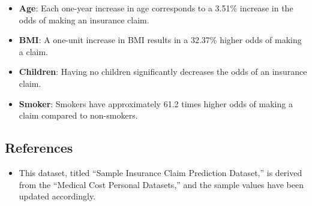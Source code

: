 \documentclass[
]{article}
\providecommand{\tightlist}{%
  \setlength{\itemsep}{0pt}\setlength{\parskip}{0pt}}
\begin{document}
\begin{itemize}
\tightlist
\item
  \textbf{Age}: Each one-year increase in age corresponds to a 3.51\%
  increase in the odds of making an insurance claim.
\item
  \textbf{BMI}: A one-unit increase in BMI results in a 32.37\% higher
  odds of making a claim.
\item
  \textbf{Children}: Having no children significantly decreases the odds
  of an insurance claim.
\item
  \textbf{Smoker}: Smokers have approximately 61.2 times higher odds of
  making a claim compared to non-smokers.
\end{itemize}

\hypertarget{references}{%
\subsection{References}\label{references}}

\begin{itemize}
\tightlist
\item
  This dataset, titled ``Sample Insurance Claim Prediction Dataset,'' is
  derived from the ``Medical Cost Personal Datasets,'' and the sample
  values have been updated accordingly.
\end{itemize}
\end{document}
